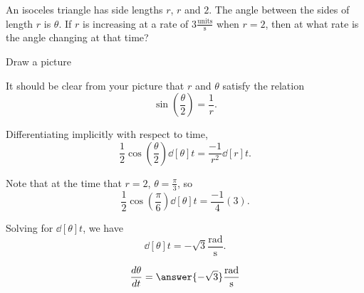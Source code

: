 \documentclass{ximera}
\author{Steven Gubkin}
\begin{document}
\begin{exercise}

An isoceles triangle has side lengths $r$, $r$ and $2$.  The angle
between the sides of length $r$ is $\theta$.  If $r$ is increasing at
a rate of $3 \frac{\textrm{units}}{\textrm{s}}$ when $r = 2$, then at
what rate is the angle changing at that time?

\begin{hint}
  Draw a picture
\end{hint}

\begin{hint}
  It should be clear from your picture that $r$ and $\theta$ satisfy the relation 
  \[
  \sin(\frac{\theta}{2}) = \frac{1}{r}.
  \]
\end{hint}

\begin{hint}
  Differentiating implicitly with respect to time, 
  \[
  \frac{1}{2}\cos(\frac{\theta}{2}) \dd[\theta]{t} = \frac{-1}{r^2}
  \dd[r]{t}.
  \]
\end{hint}

\begin{hint}
  Note that at the time that $r = 2$, $\theta = \frac{\pi}{3}$, so
  \[
  \frac{1}{2} \cos(\frac{\pi}{6}) \dd[\theta]{t} = \frac{-1}{4} (3).
  \]
\end{hint}

\begin{hint}
  Solving for $\dd[\theta]{t}$, we have
  \[
  \dd[\theta]{t} = -\sqrt{3}\frac{\textrm{rad}}{\textrm{s}}.
  \]
\end{hint}

\begin{prompt}
  \[
  \dd[\theta]{t} = \answer{-\sqrt{3}}\frac{\textrm{rad}}{\textrm{s}}
  \]
\end{prompt}
\end{exercise}
\end{document}
